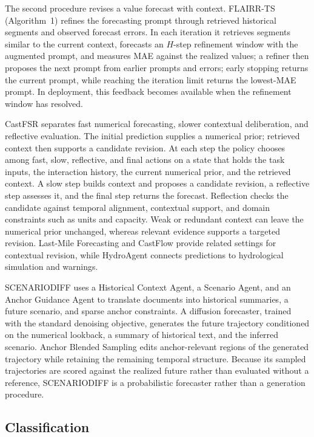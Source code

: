 \documentclass[preprints,article,submit,moreauthors]{Definitions/mdpi}
\begin{document}
The second procedure revises a value forecast with context. FLAIRR-TS \citep{flairr2025} (Algorithm~1) refines the forecasting prompt through retrieved historical segments and observed forecast errors. In each iteration it retrieves segments similar to the current context, forecasts an $H$-step refinement window with the augmented prompt, and measures MAE against the realized values; a refiner then proposes the next prompt from earlier prompts and errors; early stopping returns the current prompt, while reaching the iteration limit returns the lowest-MAE prompt. In deployment, this feedback becomes available when the refinement window has resolved.

CastFSR \citep{castfsr2026} separates fast numerical forecasting, slower contextual deliberation, and reflective evaluation. The initial prediction supplies a numerical prior; retrieved context then supports a candidate revision. At each step the policy chooses among fast, slow, reflective, and final actions on a state that holds the task inputs, the interaction history, the current numerical prior, and the retrieved context. A slow step builds context and proposes a candidate revision, a reflective step assesses it, and the final step returns the forecast. Reflection checks the candidate against temporal alignment, contextual support, and domain constraints such as units and capacity. Weak or redundant context can leave the numerical prior unchanged, whereas relevant evidence supports a targeted revision. Last-Mile Forecasting \citep{lastmile2026} and CastFlow \citep{castflow2026} provide related settings for contextual revision, while HydroAgent \citep{hydroagent2026} connects predictions to hydrological simulation and warnings.

SCENARIODIFF \citep{scenariodiff2026} uses a Historical Context Agent, a Scenario Agent, and an Anchor Guidance Agent to translate documents into historical summaries, a future scenario, and sparse anchor constraints. A diffusion forecaster, trained with the standard denoising objective, generates the future trajectory conditioned on the numerical lookback, a summary of historical text, and the inferred scenario. Anchor Blended Sampling edits anchor-relevant regions of the generated trajectory while retaining the remaining temporal structure. Because its sampled trajectories are scored against the realized future rather than evaluated without a reference, SCENARIODIFF is a probabilistic forecaster rather than a generation procedure.

\subsection{Classification}
\label{sec:task-classification}
\label{sec:task-analysis}
\label{sec:task-anomaly}
\end{document}
